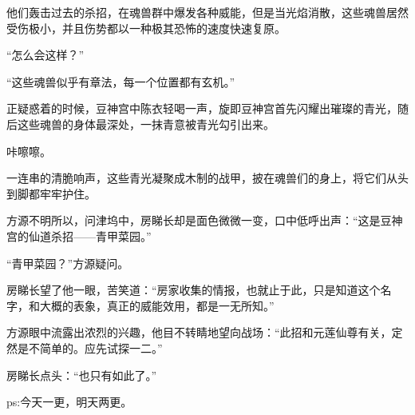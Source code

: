 \begin{this_body}
他们轰击过去的杀招，在魂兽群中爆发各种威能，但是当光焰消散，这些魂兽居然受伤极小，并且伤势都以一种极其恐怖的速度快速复原。

“怎么会这样？”

“这些魂兽似乎有章法，每一个位置都有玄机。”

正疑惑着的时候，豆神宫中陈衣轻喝一声，旋即豆神宫首先闪耀出璀璨的青光，随后这些魂兽的身体最深处，一抹青意被青光勾引出来。

咔嚓嚓。

一连串的清脆响声，这些青光凝聚成木制的战甲，披在魂兽们的身上，将它们从头到脚都牢牢护住。

方源不明所以，问津坞中，房睇长却是面色微微一变，口中低呼出声：“这是豆神宫的仙道杀招——青甲菜园。”

“青甲菜园？”方源疑问。

房睇长望了他一眼，苦笑道：“房家收集的情报，也就止于此，只是知道这个名字，和大概的表象，真正的威能效用，都是一无所知。”

方源眼中流露出浓烈的兴趣，他目不转睛地望向战场：“此招和元莲仙尊有关，定然是不简单的。应先试探一二。”

房睇长点头：“也只有如此了。”

ps:今天一更，明天两更。

\end{this_body}

